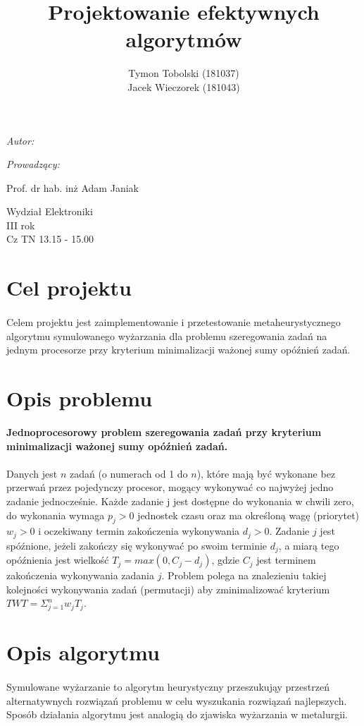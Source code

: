 \documentclass[wide,a4paper,titlepage,12pt] {article}
\title{Projektowanie efektywnych algorytmów}
\author{Tymon Tobolski (181037)\\ Jacek Wieczorek (181043)}
\makeatletter
\renewcommand{\maketitle}{
\begin{titlepage}
  \begin{center}
    \vspace*{3cm}
    \LARGE \@title \par
    \vspace{2cm}
    \textit{\small Autor:}\par
    \normalsize \@author\par \normalsize
    \vspace{3cm}
    \textit{\small Prowadzący:}\par
   Prof. dr hab. inż Adam Janiak \par
    \vspace{2cm}
    Wydział Elektroniki\\ III rok\\ Cz TN 13.15 - 15.00\par
    \vspace{4cm}
    \small \@date
  \end{center}
\end{titlepage}
}
\makeatother
\begin{document}
\maketitle
  \section{Cel projektu}
\paragraph{}
Celem projektu jest zaimplementowanie i przetestowanie metaheurystycznego algorytmu symulowanego wyżarzania dla problemu szeregowania zadań na jednym procesorze przy kryterium minimalizacji ważonej sumy opóźnień zadań.
  \section{Opis problemu}
{\bf Jednoprocesorowy problem szeregowania zadań przy kryterium
minimalizacji ważonej sumy opóźnień zadań.}
\paragraph{}
Danych jest $n$ zadań (o numerach od 1 do $n$), które mają być wykonane bez przerwań przez pojedynczy procesor, mogący wykonywać co najwyżej jedno zadanie jednocześnie.
Każde zadanie j jest dostępne do wykonania w chwili zero, do wykonania wymaga $p_{j} > 0$ jednostek czasu oraz ma określoną wagę (priorytet) $w_{j} > 0$ i oczekiwany termin zakończenia
wykonywania $d_{j} > 0$. Zadanie $j$ jest spóźnione, jeżeli zakończy się wykonywać po swoim terminie $d_{j}$, a miarą tego opóźnienia jest wielkość $T_{j} = max(0, C_{j} - d_{j} )$, gdzie $C_{j}$ jest terminem zakończenia
wykonywania zadania $j$. Problem polega na znalezieniu takiej kolejności wykonywania zadań (permutacji) aby zminimalizować kryterium $TWT = \Sigma_{j=1}^{n} w_{j} T_{j}$.
\section{Opis algorytmu}
\paragraph{}
Symulowane wyżarzanie to algorytm heurystyczny przeszukująy przestrzeń alternatywnych rozwiązań problemu w celu wyszukania rozwiązań najlepszych. Sposób działania algorytmu jest analogią do zjawiska wyżarzania w metalurgii.
\end{document}
